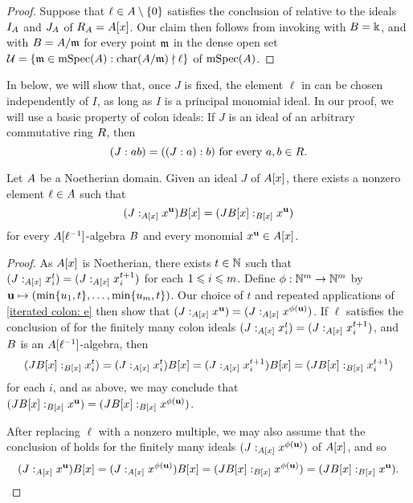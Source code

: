 \documentclass{article}
\begin{document}
 \begin{proof}
    Suppose that $\ell \in A \setminus \{0\}$ satisfies the conclusion of  relative to the ideals $I_A$ and $J_A$ of $R_A=A[x]$.  Our claim then follows from invoking  with $B=\Bbbk$, and with $B=A/\mathfrak{m}$ for every point $\mathfrak{m}$ in the dense open set $\mathcal{U} = \{\mathfrak{m} \in \operatorname{mSpec}(A) : \operatorname{char}(A/\mathfrak{m}) \nmid \ell\}$ of $\operatorname{mSpec}(A)$. 
\end{proof}

In  {below, we will show that, once $J$ is fixed, the element} $\ell$ in  can be chosen independently of $I$, {as long as $I$ is a principal monomial ideal.   In our proof, we will use a basic property of colon ideals:  If $J$ is an ideal of an arbitrary commutative ring $R$, then}
\begin{equation}
\label{iterated colon: e}
 (J: ab) = ((J: a): b) \text{ for every } a,b \in R.
\end{equation}

\begin{corollary}
   \label{all monomial colons: C} 
   Let $A$ be a Noetherian domain.
   Given an ideal $J$ of $A[x]$, there exists a nonzero element $\ell \in A$ such that
   \[ (J:_{A[x]} x^{\mathbf{u}}) B[x] = (J B[x]:_{B[x]} x^{\mathbf{u}})\]
   for every $A[\ell^{-1}]$-algebra $B$ and every monomial $x^{\mathbf{u}} \in A[x]$.   
\end{corollary}

\begin{proof}
   As $A[x]$ is Noetherian, there exists $t \in \mathbb{N}$ such that $(J:_{A[x]}x_i^t)=(J:_{A[x]}x_i^{t+1})$ for each $1 \leqslant i \leqslant m$.  Define $\phi:  \mathbb{N}^m \to \mathbb{N}^m$ by $\mathbf{u} \mapsto (\min\{u_1, t\}, \ldots, \min \{u_m,t\})$.  Our choice of $t$ and repeated applications of \eqref{iterated colon: e} then show that $(J:_{A[x]}x^{\mathbf{u}}) = (J:_{A[x]}x^{\phi(\mathbf{u})})$.
   If $\ell$ satisfies the conclusion of  for the finitely many colon ideals $(J:_{A[x]}x_i^t)=(J:_{A[x]}x_i^{t+1})$, and $B$ is an $A[\ell^{-1}]$-algebra, then
 \[
       (J B[x]:_{B[x]} x_i^{t}) = (J:_{A[x]}x_i^{t})B[x]
                               = (J:_{A[x]}x_i^{t+1})B[x]
                               =(J B[x]:_{B[x]} x_i^{t+1})
   \]
   for each $i$, and as above, we may conclude that $(J B[x]:_{B[x]}x^{\mathbf{u}}) = (J B[x]:_{B[x]}x^{\phi(\mathbf{u})})$.

   After replacing $\ell$ with a nonzero multiple, we may also assume that the conclusion of  holds for the finitely many ideals $(J:_{A[x]} x^{\phi(\mathbf{u})})$ of $A[x]$, and so
\[ (J:_{A[x]} x^{\mathbf{u}})B[x] = (J:_{A[x]} x^{\phi(\mathbf{u})})B[x] = (J B[x]:_{B[x]} x^{\phi(\mathbf{u})}) = (J B[x]:_{B[x]} x^{\mathbf{u}}). \qedhere\]
\end{proof}
\end{document}

